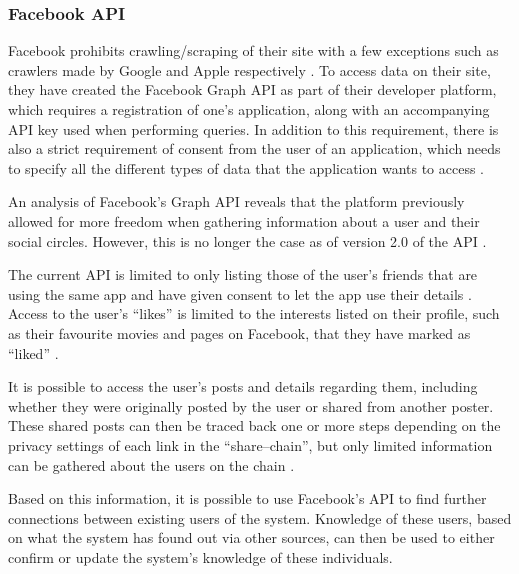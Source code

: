 \subsubsection{Facebook API}
Facebook prohibits crawling/scraping of their site with a few exceptions such as
crawlers made by Google and Apple respectively
\citep{FacebookRobotsTxt}.
To access data on their site, they have created the Facebook Graph \ac{API} as
part of their developer platform, which requires a registration of one's
application, along with an accompanying \ac{API} key used when performing
queries.
In addition to this requirement, there is also a strict requirement of consent
from the user of an application, which needs to specify all the different types
of data that the application wants to access
\citep{FacebookGraphApiAccessTokens} \Source .\nl

An analysis of Facebook's Graph \ac{API} \citep{FacebookGraphApiDocumentation}
reveals that the platform previously allowed for more freedom when gathering
information about a user and their social circles. However, this is no longer
the case as of version 2.0 of the \ac{API}
\citep{FacebookChangesInGraphTwoPointOh}.

The current \ac{API} is limited to only listing those of the user's friends
that are using the same app and have given consent to let the app use their
details \citep{FacebookChangesInGraphTwoPointOh}. Access to the user's ``likes''
is limited to the interests listed on their profile, such as their favourite
movies and pages on Facebook, that they have marked as ``liked''
\citep{FacebookGraphApiUserEdges} \citep{FacebookGraphApiUserLikes}
.\nl

It is possible to access the user's posts and details regarding them,
including whether they were originally posted by the user or shared from
another poster. These shared posts can then be traced back one or more steps
depending on the privacy settings of each link in the ``share--chain'', but
only limited information can be gathered about the users on the chain
\citep{FacebookGraphApiUserFeed}.\nl

Based on this information, it is possible to use Facebook's \ac{API} to find
further connections between existing users of the system.
Knowledge of these users, based on what the system has found out via other
sources, can then be used to either confirm or update the system's knowledge of
these individuals.